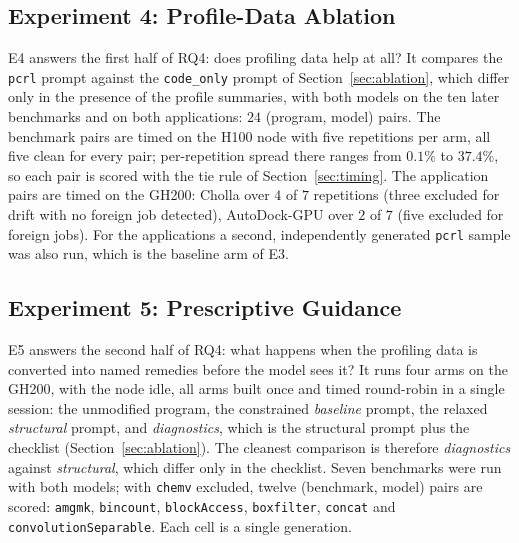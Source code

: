 \subsection{Experiment 4: Profile-Data Ablation}
\label{sec:setup-e4}
E4 answers the first half of RQ4: does profiling data help at all? It compares the \texttt{pcrl}
prompt against the \texttt{code\_only} prompt of Section~\ref{sec:ablation}, which differ only in the
presence of the profile summaries, with both models on the ten later benchmarks and on both
applications: $24$ (program, model) pairs. The benchmark pairs are timed on the H100 node with five
repetitions per arm, all five clean for every pair; per-repetition spread there ranges from $0.1\%$ to
$37.4\%$, so each pair is scored with the tie rule of Section~\ref{sec:timing}. The application pairs
are timed on the GH200: Cholla over $4$ of $7$ repetitions (three excluded for drift with no foreign
job detected), AutoDock-GPU over $2$ of $7$ (five excluded for foreign jobs). For the applications a
second, independently generated \texttt{pcrl} sample was also run, which is the baseline arm of E3.

\subsection{Experiment 5: Prescriptive Guidance}
\label{sec:setup-e5}
E5 answers the second half of RQ4: what happens when the profiling data is converted into named
remedies before the model sees it? It runs four arms on the GH200, with the node idle, all arms built
once and timed round-robin in a single session: the unmodified program, the constrained
\emph{baseline} prompt, the relaxed \emph{structural} prompt, and \emph{diagnostics}, which is the
structural prompt plus the checklist (Section~\ref{sec:ablation}). The cleanest comparison is
therefore \emph{diagnostics} against \emph{structural}, which differ only in the checklist. Seven
benchmarks were run with both models; with \texttt{chemv} excluded, twelve (benchmark, model) pairs
are scored: \texttt{amgmk}, \texttt{bincount}, \texttt{blockAccess}, \texttt{boxfilter},
\texttt{concat} and \texttt{convolutionSeparable}. Each cell is a single generation.
